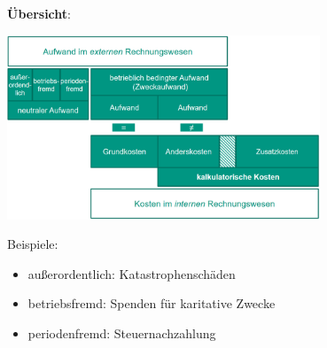 \textbf{Übersicht}:
\begin{center}
	\includegraphics[width=0.7\textwidth]{images/kk-overview.png}
\end{center}
Beispiele:
\begin{itemize}
	\item außerordentlich: Katastrophenschäden
	\item betriebsfremd: Spenden für karitative Zwecke
	\item periodenfremd: Steuernachzahlung
\end{itemize}